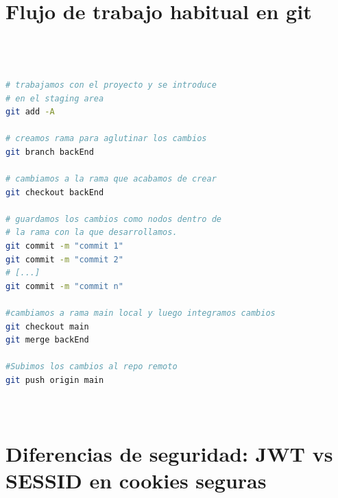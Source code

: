 \documentclass[a4paper,12pt]{report}
\begin{document}
			
		\section{Flujo de trabajo habitual en git}
		\label{sec:anexoFlujoGit}
		
\begin{lstlisting}[language=bash, basicstyle=\ttfamily\small]
	


# trabajamos con el proyecto y se introduce
# en el staging area
git add -A 

# creamos rama para aglutinar los cambios
git branch backEnd

# cambiamos a la rama que acabamos de crear
git checkout backEnd

# guardamos los cambios como nodos dentro de
# la rama con la que desarrollamos.	
git commit -m "commit 1"  	
git commit -m "commit 2"
# [...]
git commit -m "commit n"

#cambiamos a rama main local y luego integramos cambios
git checkout main
git merge backEnd

#Subimos los cambios al repo remoto
git push origin main 

	
\end{lstlisting}
		
	
\pagebreak

		
		
		\section{Diferencias de seguridad: JWT vs SESSID en cookies seguras}
		\label{sec:anexo_JWTvsSESSIONS}
						
\end{document}
